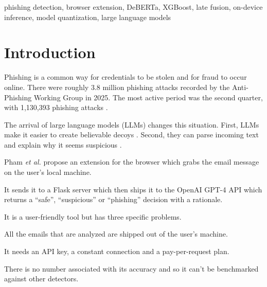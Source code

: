 \documentclass[conference]{IEEEtran}
\begin{document}
\begin{IEEEkeywords}
phishing detection, browser extension, DeBERTa, XGBoost, late fusion, on-device inference, model quantization, large language models
\end{IEEEkeywords}

\section{Introduction}
Phishing is a common way for credentials to be stolen and for fraud to occur online. There were roughly 3.8 million phishing attacks recorded by the Anti-Phishing Working Group in 2025. The most active period was the second quarter, with 1,130,393 phishing attacks \cite{apwg2025q4}.

The arrival of large language models (LLMs) changes this situation. First, LLMs make it easier to create believable decoys \cite{heiding2024devising}. Second, they can parse incoming text and explain why it seems suspicious \cite{koide2024chatspamdetector}.

Pham \emph{et al.} \cite{pham2025demo} propose an extension for the browser which grabs the email message on the user's local machine.

It sends it to a Flask server which then ships it to the OpenAI GPT-4 API which returns a ``safe'', ``suspicious'' or ``phishing'' decision with a rationale.

It is a user-friendly tool but has three specific problems.

All the emails that are analyzed are shipped out of the user's machine.

It needs an API key, a constant connection and a pay-per-request plan.

There is no number associated with its accuracy and so it can't be benchmarked against other detectors.
\end{document}
